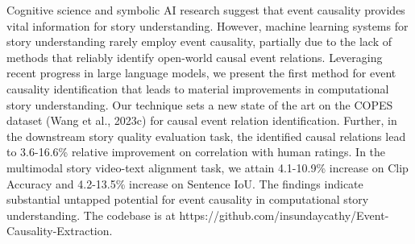 Cognitive science and symbolic AI research suggest that event causality provides vital information for story understanding. However, machine learning systems for story understanding rarely employ event causality, partially due to the lack of methods that reliably identify open-world causal event relations. Leveraging recent progress in large language models, we present the first method for event causality identification that leads to material improvements in computational story understanding. Our technique sets a new state of the art on the COPES dataset (Wang et al., 2023c) for causal event relation identification. Further, in the downstream story quality evaluation task, the identified causal relations lead to 3.6-16.6\% relative improvement on correlation with human ratings. In the multimodal story video-text alignment task, we attain 4.1-10.9\% increase on Clip Accuracy and 4.2-13.5\% increase on Sentence IoU. The findings indicate substantial untapped potential for event causality in computational story understanding. The codebase is at https://github.com/insundaycathy/Event-Causality-Extraction.
